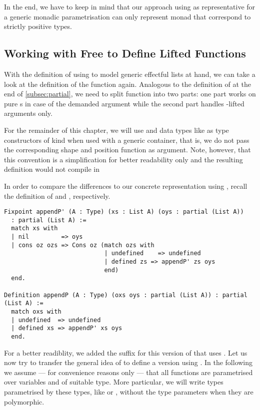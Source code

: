 In the end, we have to keep in mind that our approach using
 as representative for a generic monadic parametrisation
can only represent monad that correspond to strictly positive types.

\subsection{Working with Free to Define Lifted Functions}

With the definition of  using  to model generic
effectful lists at hand, we can take a look at the definition of the
function  again.
Analogous to the definition of  at the end of
\autoref{subsec:partial}, we need to split function into two parts:
one part works on pure s in case of the demanded argument
while the second part handles -lifted arguments only.

For the remainder of this chapter, we will use  and
data types like  as type constructors of kind  when used with a generic container, that is, we do not pass
the corresponding shape and position function as argument.
Note, however, that this convention is a simplification for better
readability only and the resulting definition would not compile in

In order to compare the differences to our concrete representation
using , recall the definition of  and
, respectively.

\begin{verbatim}
Fixpoint appendP' (A : Type) (xs : List A) (oys : partial (List A))
  : partial (List A) :=
  match xs with
  | nil         => oys
  | cons oz ozs => Cons oz (match ozs with
                            | undefined    => undefined
                            | defined zs => appendP' zs oys
                            end)
  end.

Definition appendP (A : Type) (oxs oys : partial (List A)) : partial (List A) :=
  match oxs with
  | undefined  => undefined
  | defined xs => appendP' xs oys
  end.
\end{verbatim}

For a better readiblity, we added the suffix  for this version
of  that uses .
Let us now try to transfer the general idea of  to
define a version using .
In the following we assume --- for convenience reasons only --- that
all functions are parametrised over variables  and
 of suitable type.
More particular, we will write types parametrised by these types, like
 or , without the type parameters when they are
polymorphic.


